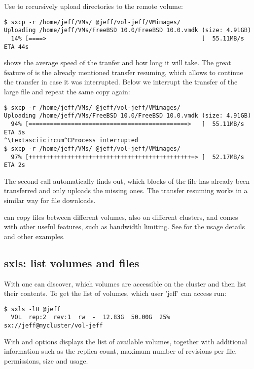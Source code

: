 Use  to recursively upload directories to the remote volume:
\begin{lstlisting}
$ sxcp -r /home/jeff/VMs/ @jeff/vol-jeff/VMimages/
Uploading /home/jeff/VMs/FreeBSD 10.0/FreeBSD 10.0.vmdk (size: 4.91GB)
  14% [====>                                            ]  55.11MB/s ETA 44s
\end{lstlisting}
 shows the average speed of the tranfer and how long it will take.
The great feature of \SX is the already mentioned transfer resuming, which
allows to continue the transfer in case it was interrupted. Below we interrupt
the transfer of the large file and repeat the same copy again:
\begin{lstlisting}
$ sxcp -r /home/jeff/VMs/ @jeff/vol-jeff/VMimages/
Uploading /home/jeff/VMs/FreeBSD 10.0/FreeBSD 10.0.vmdk (size: 4.91GB)
  94% [=============================================>   ]  55.11MB/s ETA 5s
^\textasciicircum^CProcess interrupted
$ sxcp -r /home/jeff/VMs/ @jeff/vol-jeff/VMimages/
  97% [++++++++++++++++++++++++++++++++++++++++++++++=> ]  52.17MB/s ETA 2s
\end{lstlisting}
The second  call automatically finds out, which blocks of the file
has already been transferred and only uploads the missing ones. The transfer
resuming works in a similar way for file downloads.

 can copy files between different volumes, also on different
clusters, and comes with other useful features, such as bandwidth limiting. See
 for the usage details and other examples.

\subsection{sxls: list volumes and files}
With  one can discover, which volumes are accessible on the cluster
and then list their contents. To get the list of volumes, which user 'jeff'
can access run:
\begin{lstlisting}
$ sxls -lH @jeff
  VOL  rep:2  rev:1  rw  -  12.83G  50.00G  25% sx://jeff@mycluster/vol-jeff
\end{lstlisting}
With  and  options 
displays the list of available volumes, together with additional information
such as the replica count, maximum number of revisions per file, permissions,
size and usage.

